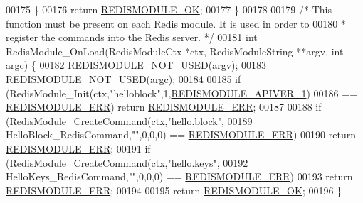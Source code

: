 \begin{DoxyCode}
00175     \}
00176     \textcolor{keywordflow}{return} \hyperlink{redismodule_8h_a1bc5bfd69abcd378ff52c640adc5418d}{REDISMODULE\_OK};
00177 \}
00178 
00179 \textcolor{comment}{/* This function must be present on each Redis module. It is used in order to}
00180 \textcolor{comment}{ * register the commands into the Redis server. */}
00181 \textcolor{keywordtype}{int} RedisModule\_OnLoad(RedisModuleCtx *ctx, RedisModuleString **argv, \textcolor{keywordtype}{int} argc) \{
00182     \hyperlink{redismodule_8h_a46d75d81383a00bd6b941af6cadf64c2}{REDISMODULE\_NOT\_USED}(argv);
00183     \hyperlink{redismodule_8h_a46d75d81383a00bd6b941af6cadf64c2}{REDISMODULE\_NOT\_USED}(argc);
00184 
00185     \textcolor{keywordflow}{if} (RedisModule\_Init(ctx,\textcolor{stringliteral}{"helloblock"},1,\hyperlink{redismodule_8h_a1fc9be44e4cd6d60f7129d4393b6b580}{REDISMODULE\_APIVER\_1})
00186         == \hyperlink{redismodule_8h_a3df6f5bd5247289e66f44437a7cddd49}{REDISMODULE\_ERR}) \textcolor{keywordflow}{return} \hyperlink{redismodule_8h_a3df6f5bd5247289e66f44437a7cddd49}{REDISMODULE\_ERR};
00187 
00188     \textcolor{keywordflow}{if} (RedisModule\_CreateCommand(ctx,\textcolor{stringliteral}{"hello.block"},
00189         HelloBlock\_RedisCommand,\textcolor{stringliteral}{""},0,0,0) == \hyperlink{redismodule_8h_a3df6f5bd5247289e66f44437a7cddd49}{REDISMODULE\_ERR})
00190         \textcolor{keywordflow}{return} \hyperlink{redismodule_8h_a3df6f5bd5247289e66f44437a7cddd49}{REDISMODULE\_ERR};
00191     \textcolor{keywordflow}{if} (RedisModule\_CreateCommand(ctx,\textcolor{stringliteral}{"hello.keys"},
00192         HelloKeys\_RedisCommand,\textcolor{stringliteral}{""},0,0,0) == \hyperlink{redismodule_8h_a3df6f5bd5247289e66f44437a7cddd49}{REDISMODULE\_ERR})
00193         \textcolor{keywordflow}{return} \hyperlink{redismodule_8h_a3df6f5bd5247289e66f44437a7cddd49}{REDISMODULE\_ERR};
00194 
00195     \textcolor{keywordflow}{return} \hyperlink{redismodule_8h_a1bc5bfd69abcd378ff52c640adc5418d}{REDISMODULE\_OK};
00196 \}
\end{DoxyCode}
